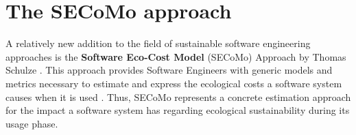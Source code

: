 \documentclass[oribibl]{llncs}
\begin{document}


\section{The SECoMo approach} %
A relatively new addition to the field of sustainable software engineering approaches %
is the %
\textbf{Software Eco-Cost Model} %
(SECoMo) Approach by Thomas Schulze %
\cite{schulze_cost_2016}. This approach provides %
Software Engineers with generic models and metrics necessary to estimate and express the ecological costs %
a software system causes when it is used \cite{schulze_cost_2016}. Thus, SECoMo represents a concrete estimation approach for the impact a software system has regarding ecological sustainability during its usage phase. 
\end{document}
